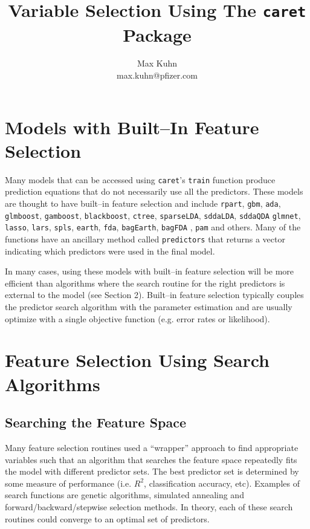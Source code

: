 \documentclass[12pt]{article}
\title{Variable Selection Using The {\tt caret} Package}
\author{Max Kuhn \\ max.kuhn@pfizer.com}
\begin{document}
\maketitle

\thispagestyle{empty}

\section{Models with Built--In Feature Selection}

Many models that can be accessed using \texttt{caret}'s \texttt{train} function produce prediction equations that do not necessarily use all the predictors. These models are thought to have built--in feature selection and include \texttt{rpart}, \texttt{gbm}, \texttt{ada}, \texttt{glmboost}, \texttt{gamboost}, \texttt{blackboost}, \texttt{ctree}, \texttt{sparseLDA}, \texttt{sddaLDA}, \texttt{sddaQDA}	\texttt{glmnet}, \texttt{lasso}, \texttt{lars}, \texttt{spls}, \texttt{earth}, \texttt{fda},   \texttt{bagEarth}, \texttt{bagFDA} , \texttt{pam} and others. Many of the functions have an ancillary method called \texttt{predictors} that returns a vector indicating which predictors were used in the final model.

In many cases, using these models with built--in feature selection will be more efficient than algorithms where the search routine for the right predictors is external to the model (see Section 2). Built--in feature selection typically couples the predictor search algorithm with the parameter  estimation and are usually optimize with a single objective function (e.g. error rates or likelihood). 


\section{Feature Selection Using Search Algorithms}

\subsection{Searching the Feature Space}

Many feature selection routines used a ``wrapper'' approach to find appropriate variables such that an algorithm that searches the feature space repeatedly fits the model with different predictor sets. The best predictor set is determined by some measure of performance (i.e. $R^2$, classification accuracy, etc). Examples of search functions are genetic algorithms, simulated annealing and forward/backward/stepwise selection methods. In theory, each of these search routines could converge to an optimal set of predictors.
\end{document}
